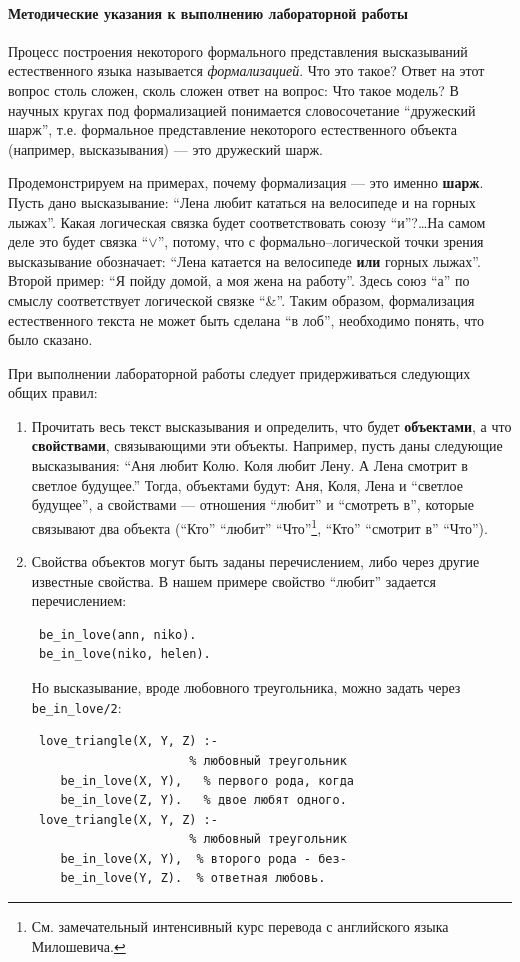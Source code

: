 \documentclass[12pt, openany, twoside]{book} %
\begin{document}
\paragraph{Методические указания к выполнению лабораторной работы}
Процесс построения некоторого формального представления высказываний естественного языка называется {\em формализацией}. Что это такое? Ответ на этот вопрос столь сложен, сколь сложен ответ на вопрос: Что такое модель? В научных кругах под формализацией понимается словосочетание ``дружеский шарж'', т.е. формальное представление некоторого естественного объекта (например, высказывания) --- это дружеский шарж.

Продемонстрируем на примерах, почему формализация --- это именно {\bf шарж}. Пусть дано высказывание: ``Лена любит кататься на велосипеде и на горных лыжах''. Какая логическая связка будет соответствовать союзу ``и''?\ldots На самом деле это будет связка ``$\vee$'', потому, что с формально--логической точки зрения высказывание обозначает: ``Лена катается на велосипеде {\bf или} горных лыжах''. Второй пример: ``Я пойду домой, а моя жена на работу''. Здесь союз ``а'' по смыслу соответствует логической связке ``\&''. Таким образом, формализация естественного текста не может быть сделана ``в лоб'', необходимо понять, что было сказано.

При выполнении лабораторной работы следует придерживаться следующих общих правил:
\begin{enumerate}
\item Прочитать весь текст высказывания и определить, что будет {\bf объектами}, а что {\bf свойствами}, связывающими эти объекты. Например, пусть даны следующие высказывания: ``Аня любит Колю. Коля любит Лену. А Лена смотрит в светлое будущее.'' Тогда, объектами будут: Аня, Коля, Лена и ``светлое будущее'', а свойствами --- отношения ``любит'' и ``смотреть в'', которые связывают два объекта (``Кто'' ``любит''
``Что''\footnote{См. замечательный интенсивный курс перевода с английского языка Милошевича.}, ``Кто'' ``смотрит в'' ``Что'').
\item Свойства объектов могут быть заданы перечислением, либо через другие известные свойства. В нашем примере свойство ``любит'' задается перечислением:
{\tt\begin{verbatim}
 be_in_love(ann, niko).
 be_in_love(niko, helen).
\end{verbatim}}
\noindent Но высказывание, вроде любовного треугольника, можно задать через {\tt be\_in\_love/2}:
{\tt\begin{verbatim}
 love_triangle(X, Y, Z) :-
                      % любовный треугольник
    be_in_love(X, Y),   % первого рода, когда
    be_in_love(Z, Y).   % двое любят одного.
 love_triangle(X, Y, Z) :-
                      % любовный треугольник
    be_in_love(X, Y),  % второго рода - без-
    be_in_love(Y, Z).  % ответная любовь.
\end{verbatim}}
\end{enumerate}
\end{document}
